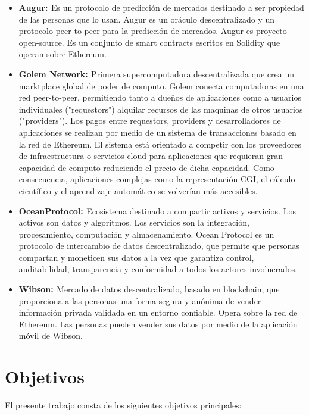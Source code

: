 \documentclass[
11pt, %
oneside, %
spanish, %
singlespacing, %
parskip, %
headsepline, %
chapterinoneline, %
]{MastersDoctoralThesis} %
\begin{document}
\begin{itemize}
\item \textbf{Augur: \cite{aug}} Es un protocolo de predicción de mercados destinado a ser propiedad de las personas que lo usan.
Augur es un oráculo descentralizado y un protocolo peer to peer para la predicción de mercados. Augur es proyecto open-source. Es un conjunto de smart contracts escritos en Solidity que operan sobre Ethereum.


\item \textbf{Golem Network: \cite{gn}} Primera supercomputadora descentralizada que crea un marktplace global de poder de computo.
Golem conecta computadoras en una red peer-to-peer, permitiendo tanto a dueños de aplicaciones como a usuarios individuales ("requestors") alquilar recursos de las maquinas de otros usuarios ("providers"). Los pagos entre requestors, providers y desarrolladores de aplicaciones se realizan por medio de un sistema de transacciones basado en la red de Ethereum. 
El sistema está orientado a competir con los proveedores de infraestructura o servicios cloud para aplicaciones que requieran gran capacidad de computo reduciendo el precio de dicha capacidad. Como consecuencia, aplicaciones complejas como la representación CGI, el cálculo científico y el aprendizaje automático se volverían más accesibles.

\item \textbf{OceanProtocol: \cite{oc}} Ecosistema destinado a compartir activos y servicios. 
Los activos son datos y algoritmos. Los servicios son la integración, procesamiento, computación y almacenamiento. 
Ocean Protocol es un protocolo de intercambio de datos descentralizado, que permite que personas compartan y moneticen sus datos a la vez que garantiza control, auditabilidad, transparencia y conformidad a todos los actores involucrados.

\item \textbf{Wibson: \cite{wib}} Mercado de datos descentralizado, basado en blockchain, que proporciona a las personas una forma segura y anónima de vender información privada validada en un entorno confiable. Opera sobre la red de Ethereum. Las personas pueden vender sus datos por medio de la aplicación móvil de Wibson.
\end{itemize}

\chapter{Objetivos}
El presente trabajo consta de los siguientes objetivos principales:
\end{document}
